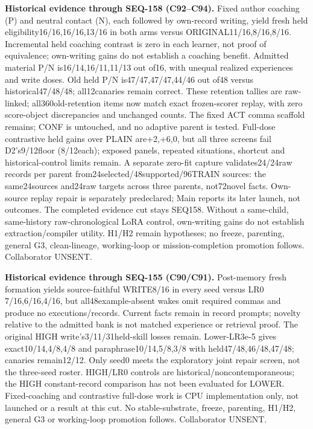 \documentclass{article}
\begin{document}
\noindent\textbf{Historical evidence through SEQ-158 (C92--C94).}
Fixed author coaching (P) and neutral contact (N), each followed by own-record
writing, yield fresh held eligibility16/16,16/16,13/16 in both arms versus
ORIGINAL11/16,8/16,8/16. Incremental held coaching contrast is zero in each learner, not
proof of equivalence; own-writing gains do not establish a coaching benefit.
Admitted material P/N is16/14,16/11,11/13 out of16, with unequal realized
experiences and write doses. Old held P/N is47/47,47/47,44/46 out of48 versus
historical47/48/48; all12canaries remain correct. These retention tallies are
raw-linked; all360old-retention items now match exact frozen-scorer replay,
with zero score-object discrepancies and unchanged counts.
The fixed ACT comma scaffold remains; CONF is untouched, and no adaptive parent
is tested. Full-dose contrastive held gains over PLAIN are+2,+6,0, but all three
screens fail D2's9/12floor (8/12each); exposed panels, repeated situations,
shortcut and historical-control limits remain. A separate zero-fit capture
validates24/24raw records per parent from24selected/48supported/96TRAIN sources:
the same24sources and24raw targets across three parents, not72novel facts.
Own-source replay repair is separately predeclared; Main reports its later launch,
not outcomes. The completed evidence cut stays SEQ158. Without a same-child,
same-history raw-chronological LoRA control, own-writing gains do not establish
extraction/compiler utility. H1/H2 remain hypotheses; no freeze, parenting, general G3, clean-lineage,
working-loop or mission-completion promotion follows. Collaborator UNSENT.

\noindent\textbf{Historical evidence through SEQ-155 (C90/C91).}
Post-memory fresh formation yields source-faithful WRITE8/16 in every seed
versus LR0 7/16,6/16,4/16, but all48example-absent wakes omit required commas
and produce no executions/records. Current facts remain in record prompts;
novelty relative to the admitted bank is not matched experience or retrieval proof.
The original HIGH write's3/11/31held-skill losses remain. Lower-LR3e-5 gives
exact10/14,4/8,4/8 and paraphrase10/14,5/8,3/8 with held47/48,46/48,47/48;
canaries remain12/12. Only seed0 meets the exploratory joint repair screen,
not the three-seed roster. HIGH/LR0 controls are historical/noncontemporaneous;
the HIGH constant-record comparison has not been evaluated for LOWER.
Fixed-coaching and contrastive full-dose work is CPU implementation only,
not launched or a result at this cut. No stable-substrate, freeze, parenting,
H1/H2, general G3 or working-loop promotion follows. Collaborator UNSENT.
\end{document}
